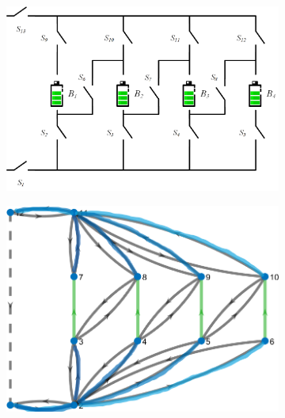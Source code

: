 \documentclass{article}
\begin{document}
\begin{figure}[htbp]
    \centering
    \begin{subfigure}[b]{0.45\textwidth}
        \includegraphics[width=\textwidth]{../attachments/f4-phy.png}
        \caption{}
        \label{fig:f4-phy}
    \end{subfigure}
    \hspace{0.05\textwidth}
    \begin{subfigure}[b]{0.45\textwidth}
        \includegraphics[width=\textwidth]{../attachments/v3-new-main-2.png}
        \caption{}
        \label{fig:f4-gra}
    \end{subfigure}
    \\
    \begin{subfigure}[b]{0.45\textwidth}

\end{subfigure}
\end{figure}
\end{document}
